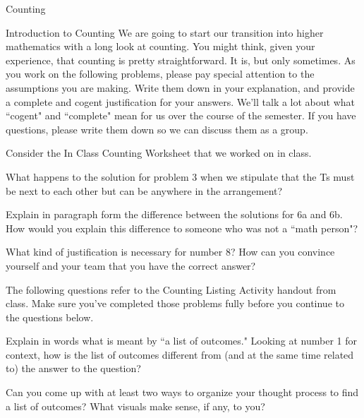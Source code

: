 \begin{chapter}{Counting}

\begin{section}{Introduction to Counting}
We are going to start our transition into higher mathematics with a long look at counting. You might think, given your experience, that counting is pretty straightforward. It is, but only sometimes. As you work on the following problems, please pay special attention to the assumptions you are making. Write them down in your explanation, and provide a complete and cogent justification for your answers. We'll talk a lot about what ``cogent" and ``complete" mean for us over the course of the semester. If you have questions, please write them down so we can discuss them as a group.

\vspace{1 cm}

Consider the  In Class Counting Worksheet that we worked on in class. 

\begin{question}
What happens to the solution for problem 3 when we stipulate that the Ts must be next to each other but can be anywhere in the arrangement?
\end{question}

\begin{question}
Explain in paragraph form the difference between the solutions for 6a and 6b. How would you explain this difference to someone who was not a ``math person"?
\end{question}

\begin{question}
What kind of justification is necessary for number 8? How can you convince yourself and your team that you have the correct answer?
\end{question}

The following questions refer to the Counting Listing Activity handout from class. Make sure you've completed those problems fully before you continue to the questions below.

\begin{question}
Explain in words what is meant by ``a list of outcomes." Looking at number 1 for context, how is the list of outcomes different from (and at the same time related to) the answer to the question?
\end{question}

\begin{question}
Can you come up with at least two ways to organize your thought process to find a list of outcomes? What visuals make sense, if any, to you?
\end{question}


\end{section}
\end{chapter}
